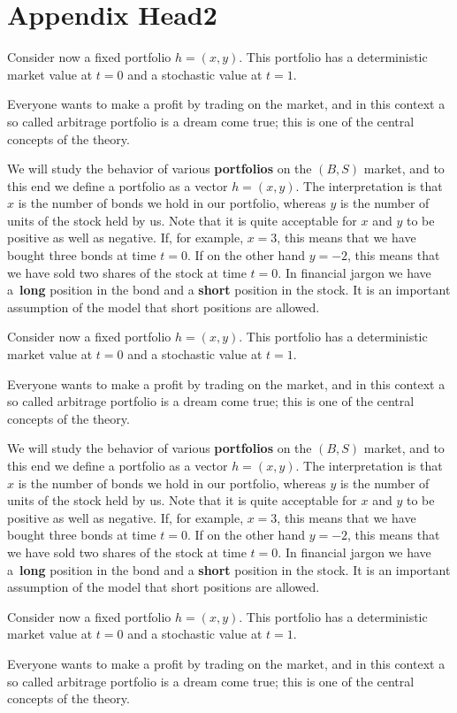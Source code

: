 \documentclass{Base}
\begin{document}
\section{Appendix Head2}

Consider now a fixed portfolio $h=(x,y)$. This portfolio has a
deterministic market value at $t=0$ and a stochastic value at
$t=1$.

Everyone wants to make a profit by trading on the market, and in
this context a so called arbitrage portfolio is a dream come true;
this is one of the central concepts of the theory.

We will study the behavior of various {\bf portfolios}
 on the $(B,S)$
market, and to this end we define a portfolio as a vector
$h=(x,y)$. The interpretation is that $x$ is the number of bonds
we hold in our portfolio, whereas $y$ is the number of units of
the stock held by us. Note that it is quite acceptable for $x$ and
$y$ to be positive as well as negative. If, for example, $x=3$,
this means that we have bought three bonds at time $t=0$. If on
the other hand $y=-2$, this means that we have sold two shares of
the stock at time $t=0$. In financial jargon we have a~{\bf long}
position in the bond and a {\bf short} position in the stock. It
is an important assumption of the model that short positions are
allowed.

Consider now a fixed portfolio $h=(x,y)$. This portfolio has a
deterministic market value at $t=0$ and a stochastic value at
$t=1$.

Everyone wants to make a profit by trading on the market, and in
this context a so called arbitrage portfolio is a dream come true;
this is one of the central concepts of the theory.

We will study the behavior of various {\bf portfolios}
 on the $(B,S)$
market, and to this end we define a portfolio as a vector
$h=(x,y)$. The interpretation is that $x$ is the number of bonds
we hold in our portfolio, whereas $y$ is the number of units of
the stock held by us. Note that it is quite acceptable for $x$ and
$y$ to be positive as well as negative. If, for example, $x=3$,
this means that we have bought three bonds at time $t=0$. If on
the other hand $y=-2$, this means that we have sold two shares of
the stock at time $t=0$. In financial jargon we have a~{\bf long}
position in the bond and a {\bf short} position in the stock. It
is an important assumption of the model that short positions are
allowed.

Consider now a fixed portfolio $h=(x,y)$. This portfolio has a
deterministic market value at $t=0$ and a stochastic value at
$t=1$.

Everyone wants to make a profit by trading on the market, and in
this context a so called arbitrage portfolio is a dream come true;
this is one of the central concepts of the theory.
\end{document}
